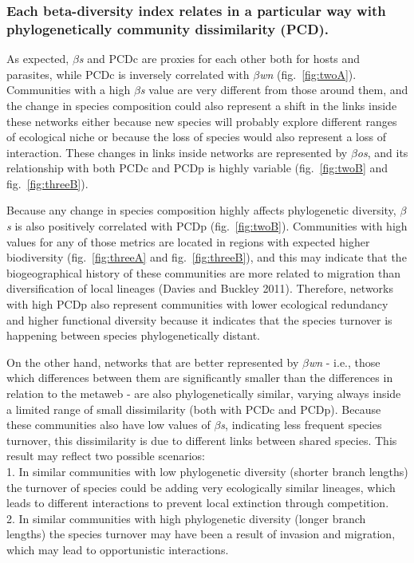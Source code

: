 \documentclass[12pt]{article}
\begin{document}
\hypertarget{each-beta-diversity-index-relates-in-a-particular-way-with-phylogenetically-community-dissimilarity-pcd.}{%
\subsubsection{Each beta-diversity index relates in a particular way
with phylogenetically community dissimilarity
(PCD).}\label{each-beta-diversity-index-relates-in-a-particular-way-with-phylogenetically-community-dissimilarity-pcd.}}

As expected, \emph{\(\beta\)s} and PCDc are proxies for each other both
for hosts and parasites, while PCDc is inversely correlated with
\emph{\(\beta\)wn} (fig.~\ref{fig:twoA}). Communities with a high
\emph{\(\beta\)s} value are very different from those around them, and
the change in species composition could also represent a shift in the
links inside these networks either because new species will probably
explore different ranges of ecological niche or because the loss of
species would also represent a loss of interaction. These changes in
links inside networks are represented by \emph{\(\beta\)os}, and its
relationship with both PCDc and PCDp is highly variable
(fig.~\ref{fig:twoB} and fig.~\ref{fig:threeB}).

Because any change in species composition highly affects phylogenetic
diversity, \emph{\(\beta\)s} is also positively correlated with PCDp
(fig.~\ref{fig:twoB}). Communities with high values for any of those
metrics are located in regions with expected higher biodiversity
(fig.~\ref{fig:threeA} and fig.~\ref{fig:threeB}), and this may indicate
that the biogeographical history of these communities are more related
to migration than diversification of local lineages (Davies and Buckley
2011). Therefore, networks with high PCDp also represent communities
with lower ecological redundancy and higher functional diversity because
it indicates that the species turnover is happening between species
phylogenetically distant.

On the other hand, networks that are better represented by
\emph{\(\beta\)wn} - i.e., those which differences between them are
significantly smaller than the differences in relation to the metaweb -
are also phylogenetically similar, varying always inside a limited range
of small dissimilarity (both with PCDc and PCDp). Because these
communities also have low values of \emph{\(\beta\)s}, indicating less
frequent species turnover, this dissimilarity is due to different links
between shared species. This result may reflect two possible
scenarios:\\
1. In similar communities with low phylogenetic diversity (shorter
branch lengths) the turnover of species could be adding very
ecologically similar lineages, which leads to different interactions to
prevent local extinction through competition.\\
2. In similar communities with high phylogenetic diversity (longer
branch lengths) the species turnover may have been a result of invasion
and migration, which may lead to opportunistic interactions.
\end{document}
